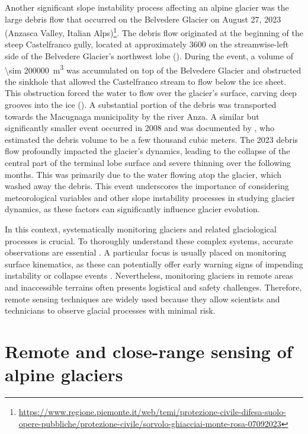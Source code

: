Another significant slope instability process affecting an alpine glacier was the large debris flow that occurred on the Belvedere Glacier on August 27, 2023 (Anzasca Valley, Italian Alps)\footnote{\url{https://www.regione.piemonte.it/web/temi/protezione-civile-difesa-suolo-opere-pubbliche/protezione-civile/sorvolo-ghiacciai-monte-rosa-07092023}}. 
The debris flow originated at the beginning of the steep Castelfranco gully, located at approximately \SI{3600}{\masl} on the streamwise-left side of the Belvedere Glacier's northwest lobe ().
During the event, a volume of \SI{\sim 200000}{\cubic\meter} was accumulated on top of the Belvedere Glacier and obstructed the sinkhole that allowed the Castelfranco stream to flow below the ice sheet. 
This obstruction forced the water to flow over the glacier's surface, carving deep grooves into the ice ().
A substantial portion of the debris was transported towards the Macugnaga municipality by the river Anza.
A similar but significantly smaller event occurred in 2008 and was documented by \citet{Mortara2009}, who estimated the debris volume to be a few thousand cubic meters.
The 2023 debris flow profoundly impacted the glacier's dynamics, leading to the collapse of the central part of the terminal lobe surface and severe thinning over the following months. 
This was primarily due to the water flowing atop the glacier, which washed away the debris.
This event underscores the importance of considering meteorological variables and other slope instability processes in studying glacier dynamics, as these factors can significantly influence glacier evolution.

In this context, systematically monitoring glaciers and related glaciological processes is crucial.
To thoroughly understand these complex systems, accurate observations are essential \citep{Kaab2005}.
A particular focus is usually placed on monitoring surface kinematics, as these can potentially offer early warning signs of impending instability or collapse events \citep{Faillettaz2015, Giordan2020a}.
Nevertheless, monitoring glaciers in remote areas and inaccessible terrains often presents logistical and safety challenges.
Therefore, remote sensing techniques are widely used because they allow scientists and technicians to observe glacial processes with minimal risk. 

\section{Remote and close-range sensing of alpine glaciers}

